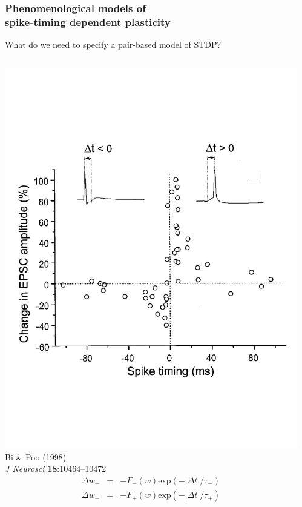 \documentclass{beamer}
\begin{document}
\begin{frame}
  \frametitle{Phenomenological models of \\spike-timing dependent plasticity}
What do we need to specify a pair-based model of STDP?
  \begin{columns}[T]
\includegraphics[width=\textwidth]{./figures/bi_stdp}
\vspace*{3mm}
\tiny{Bi \&  Poo (1998)\\
\textit{J Neurosci} \textbf{18}:10464--10472
}
{\scriptsize
\begin{eqnarray*}
  \Delta w_{-} & = & -F_{-}\left(w\right)\mathrm{exp}\left(-\left|\Delta t\right|/\tau_{-}\right)\nonumber\\
 \Delta w_{+} & = & -F_{+}\left(w\right)\mathrm{exp}\left(-\left|\Delta t\right|/\tau_{+}\right)\nonumber
\end{eqnarray*}
}
\vspace*{-4mm}
\begin{itemize}

\end{itemize}
\end{columns}
\end{frame}
\end{document}
